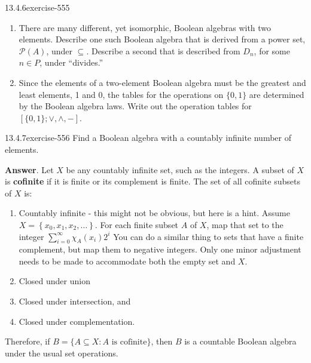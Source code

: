 \documentclass[twoside,10pt,]{book}
\newcommand{\terminology}[1]{\textbf{#1}}
\numberwithin{equation}{section}
\begin{document}
\begin{divisionsolution}{13.4.6}{}{exercise-555}%
\hypertarget{p-4949}{}%
\leavevmode%
\begin{enumerate}[label=(\alph*)]
\item\hypertarget{li-2248}{}\hypertarget{p-4950}{}%
There are many different, yet isomorphic, Boolean algebras with two elements. Describe one such Boolean algebra that is derived from a power set, \(\mathcal{P}(A)\), under \(\subseteq\). Describe a second that is described from \(D_n\), for some \(n \in  P\), under ``divides.''%
\item\hypertarget{li-2249}{}\hypertarget{p-4951}{}%
Since the elements of a two-element Boolean algebra must be the greatest and least elements, 1 and 0, the tables for the operations on \(\{0, 1\}\) are determined by the Boolean algebra laws. Write out the operation tables for \([\{0, 1\}; \lor , \land, -]\).%
\end{enumerate}
%
\end{divisionsolution}%
\begin{divisionsolution}{13.4.7}{}{exercise-556}%
\hypertarget{p-4952}{}%
Find a Boolean algebra with a countably infinite number of elements.%
\par\smallskip%
\noindent\textbf{Answer}.\quad%
\hypertarget{p-4953}{}%
Let \(X\) be any countably infinite set, such as the integers. A subset of \(X\) is \terminology{cofinite} if it is finite or its complement is finite. The set of all cofinite subsets of \(X\) is:\leavevmode%
\begin{enumerate}[label=(\alph*)]
\item\hypertarget{li-2250}{}\hypertarget{p-4954}{}%
Countably infinite - this might not be obvious, but here is a hint.  Assume \(X=\left\{x_0,x_1,x_2,\ldots \right\}\).  For each finite subset \(A\) of \(X\),  map that set to the integer \(\sum _{i=0}^{\infty } \chi _A \left(x_i\right)2^i\) You can do a similar thing to sets that have a finite complement, but map them to negative integers.  Only one minor adjustment needs to be made to accommodate both the empty set and \(X\).%
\item\hypertarget{li-2251}{}\hypertarget{p-4955}{}%
Closed under union%
\item\hypertarget{li-2252}{}\hypertarget{p-4956}{}%
Closed under intersection, and%
\item\hypertarget{li-2253}{}\hypertarget{p-4957}{}%
Closed under complementation.%
\end{enumerate}
Therefore, if \(B =\{A \subseteq  X : A \textrm{ is cofinite}\}\), then \(B\) is a countable Boolean algebra under the usual set operations.%
\end{divisionsolution}%
\end{document}
